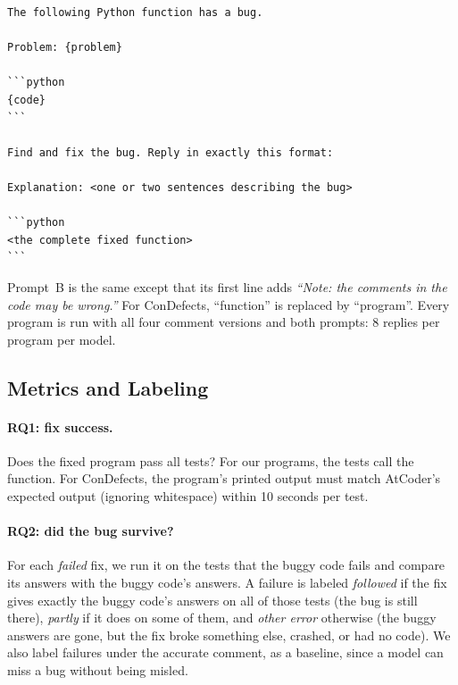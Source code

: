 \documentclass[sigconf,nonacm]{acmart}
\newcommand{\cd}{ConDefects}
\begin{document}
\begin{lstlisting}
The following Python function has a bug.

Problem: {problem}

```python
{code}
```

Find and fix the bug. Reply in exactly this format:

Explanation: <one or two sentences describing the bug>

```python
<the complete fixed function>
```
\end{lstlisting}

\noindent Prompt~B is the same except that its first line adds \emph{``Note: the comments in the code may be wrong.''} For \cd{}, ``function'' is replaced by ``program''. Every program is run with all four comment versions and both prompts: 8 replies per program per model.

\subsection{Metrics and Labeling}

\paragraph{RQ1: fix success.} Does the fixed program pass all tests? For our programs, the tests call the function. For \cd{}, the program's printed output must match AtCoder's expected output (ignoring whitespace) within 10 seconds per test.

\paragraph{RQ2: did the bug survive?} For each \emph{failed} fix, we run it on the tests that the buggy code fails and compare its answers with the buggy code's answers. A failure is labeled \emph{followed} if the fix gives exactly the buggy code's answers on all of those tests (the bug is still there), \emph{partly} if it does on some of them, and \emph{other error} otherwise (the buggy answers are gone, but the fix broke something else, crashed, or had no code). We also label failures under the accurate comment, as a baseline, since a model can miss a bug without being misled.
\end{document}
